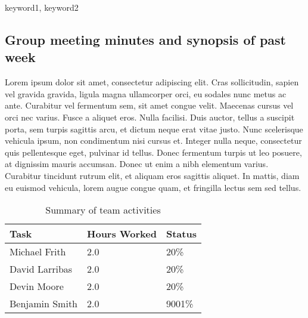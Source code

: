 \documentclass[12pt,journal,compsoc]{IEEEtran}
\newcommand{\KEYWORDS}{keyword1, keyword2}
\newcommand{\ABSTRACT}{we think....}
\begin{document}


\begin{keywords}
\KEYWORDS
\end{keywords}

\begin{abstract}
\ABSTRACT
\end{abstract}
	 

\subsection{Group meeting minutes and synopsis of past week}

Lorem ipsum dolor sit amet, consectetur adipiscing elit. Cras sollicitudin, sapien vel gravida gravida, ligula magna ullamcorper orci, eu sodales nunc metus ac ante. Curabitur vel fermentum sem, sit amet congue velit. Maecenas cursus vel orci nec varius. Fusce a aliquet eros. Nulla facilisi. Duis auctor, tellus a suscipit porta, sem turpis sagittis arcu, et dictum neque erat vitae justo. Nunc scelerisque vehicula ipsum, non condimentum nisi cursus et. Integer nulla neque, consectetur quis pellentesque eget, pulvinar id tellus. Donec fermentum turpis ut leo posuere, at dignissim mauris accumsan. Donec ut enim a nibh elementum varius. Curabitur tincidunt rutrum elit, et aliquam eros sagittis aliquet. In mattis, diam eu euismod vehicula, lorem augue congue quam, et fringilla lectus sem sed tellus.

\begin{table}[ht]
\renewcommand{\arraystretch}{1.3}
	\caption{Summary of team activities}
	
	\label{Summary of team activities}
	
	\centering
	\begin{tabular}{p{5.5cm}|p{1cm}|p{1cm}}
	\hline
	\bfseries 	Task		 		& \bfseries Hours Worked	& \bfseries Status	\\
	\hline
	\hline
				Michael Frith		& 2.0						& 20\%				\\	%
				David Larribas 		& 2.0						& 20\%				\\	
				Devin Moore 		& 2.0						& 20\%				\\	
				Benjamin Smith		& 2.0						& 9001\%			\\	
	\hline
	\end{tabular}
\end{table}
\end{document}
